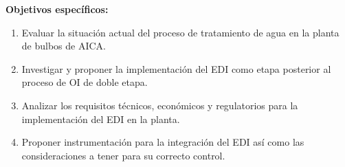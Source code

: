 \textbf{Objetivos específicos:}
\begin{enumerate}
      \item Evaluar la situación actual del proceso de
            tratamiento de agua en la planta de bulbos de AICA.
      \item Investigar y proponer la implementación del EDI
            como etapa posterior al proceso de OI de doble etapa.
      \item Analizar los requisitos técnicos, económicos y regulatorios
            para la implementación del EDI en la planta.
      \item Proponer instrumentación para la
            integración del EDI así como las consideraciones a tener para su
            correcto control.
\end{enumerate}